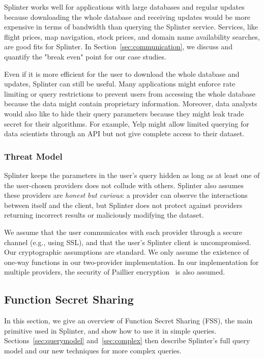 Splinter works well for applications with large databases
and regular updates because downloading the whole
database and receiving updates would be more expensive in terms
of bandwidth than querying the Splinter service. Services,
like flight prices, map navigation, stock prices, 
and domain name availability searches, are good fits for Splinter.
In Section~\ref{sec:communication}, we discuss and 
quantify the "break even" point for our case studies.

Even if it is more efficient for the user to download the whole
database and updates, Splinter can still be useful.
Many applications might enforce rate limiting or query restrictions
to prevent users from accessing the whole database
because the data might contain proprietary information. Moreover,
data analysts would also like to hide their query parameters because
they might leak trade secret for their algorithms. 
For example, Yelp might allow limited querying
for data scientists through an API but not give complete access to their dataset.

\subsubsection{Threat Model}
Splinter keeps the parameters in the user's query hidden
as long as at least one of the user-chosen providers does not collude with others. 
Splinter also assumes these providers are \textit{honest but curious}: a provider can observe the interactions between
itself and the client, but 
Splinter does not protect against providers returning incorrect results or maliciously modifying the dataset.

We assume that the user communicates with each provider through a secure channel (e.g., using SSL),
and that the user's Splinter client is uncompromised. 
Our cryptographic assumptions are standard.
We only assume the existence of one-way functions in our two-provider implementation.
In our implementation for multiple providers, the security of Paillier encryption~\cite{paillier} is also assumed.

\subsection{Function Secret Sharing}
\label{sec:queries}
In this section, we give an overview of Function Secret Sharing (FSS),
the main primitive used in Splinter, and show how to use it in simple queries.
Sections~\ref{sec:querymodel} and~\ref{sec:complex} then describe Splinter's full
query model and our new techniques for more complex queries.

